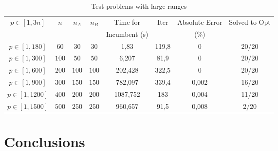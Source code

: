 \documentclass[opre,nonblindrev]{informs3} %
\begin{document}
\begin{table*}[h]\scriptsize
	\begin{center}
		\begin{tabular}{||c| c |c | c|| c||c ||c|| c||}\hline
			\multirow{3}{*}{$p \in [1,3n]$} &\multirow{3}{*}{$n$} & \multirow{3}{*}{$n_A$} & \multirow{3}{*}{$n_B$} & \multirow{2}{*}{Time for } & \multirow{3}{*}{Iter}& \multirow{2}{*}{Absolute Error }& \multirow{3}{*}{Solved to Opt}\\
			& &  &&  && & \\
			& &  &&Incumbent (s)  &&(\%)& \\
			
			\hline
			$p\in[1,180]$	 & $60$ & $30$   & $30$   &  1,83
			&  119,8 &0&20/20
			\\
			
			$p\in[1,300]$	 & $100$ & $50$   & $50$   &  6,207
			& 81,9&0&20/20
			\\
			$p\in[1,600]$ &$200$  &  $100$	 & $100$ &202,428
			&322,5&0&20/20
			\\ 
			
			$p\in[1,900] $ & $300$	 & $150$   & $150$   & 782,097
			& 339,4 &0,002 & 16/20
			
			\\
			$p\in[1,1200]$ & $400$  & $200$	 & $200$ & 1087,752
			&183 &0,004&11/20
			
			\\ 
			
			$p\in[1,1500]$ & $500$	 & $250$   & $250$   & 960,657
			
			& 91,5
			&0,008 &2/20
			
			\\ \hline
			
		\end{tabular}
	\end{center}
	\caption{Test problems with large ranges} \label{large}
\end{table*}




\section{Conclusions}



 

\end{document}
